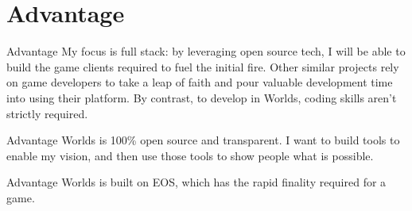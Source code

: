 \documentclass[final, xcolor=pdftex, dvipsnames, table, aspectratio=169, 14pt]{beamer}
\begin{document}
%

\section{Advantage}
\begin{frame}{Advantage}
My focus is full stack: by leveraging open source tech, I will be able to build the game clients required to fuel the initial fire. Other similar projects rely on game developers to take a leap of faith and pour valuable development time into using their platform. By contrast, to develop in Worlds, coding skills aren't strictly required. 
\end{frame}

\begin{frame}{Advantage}
Worlds is 100\% open source and transparent. I want to build tools to enable my vision, and then use those tools to show people what is possible.
\end{frame}

\begin{frame}{Advantage}
Worlds is built on EOS, which has the rapid finality required for a game. 
\end{frame}

\end{document}
